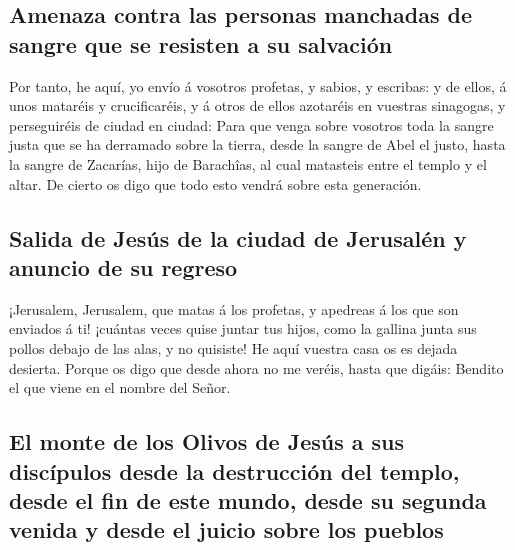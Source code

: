 \hypertarget{amenaza-contra-las-personas-manchadas-de-sangre-que-se-resisten-a-su-salvaciuxf3n}{%
\subsection{Amenaza contra las personas manchadas de sangre que se
resisten a su
salvación}\label{amenaza-contra-las-personas-manchadas-de-sangre-que-se-resisten-a-su-salvaciuxf3n}}

 Por tanto, he aquí, yo envío á vosotros profetas, y
sabios, y escribas: y de ellos, á unos mataréis y crucificaréis, y á
otros de ellos azotaréis en vuestras sinagogas, y perseguiréis de ciudad
en ciudad:  Para que venga sobre vosotros toda la sangre
justa que se ha derramado sobre la tierra, desde la sangre de Abel el
justo, hasta la sangre de Zacarías, hijo de Barachîas, al cual matasteis
entre el templo y el altar.  De cierto os digo que todo
esto vendrá sobre esta generación.

\hypertarget{salida-de-jesuxfas-de-la-ciudad-de-jerusaluxe9n-y-anuncio-de-su-regreso}{%
\subsection{Salida de Jesús de la ciudad de Jerusalén y anuncio de su
regreso}\label{salida-de-jesuxfas-de-la-ciudad-de-jerusaluxe9n-y-anuncio-de-su-regreso}}

 ¡Jerusalem, Jerusalem, que matas á los profetas, y
apedreas á los que son enviados á ti! ¡cuántas veces quise juntar tus
hijos, como la gallina junta sus pollos debajo de las alas, y no
quisiste!  He aquí vuestra casa os es dejada desierta.
 Porque os digo que desde ahora no me veréis, hasta que
digáis: Bendito el que viene en el nombre del Señor.

\hypertarget{el-monte-de-los-olivos-de-jesuxfas-a-sus-discuxedpulos-desde-la-destrucciuxf3n-del-templo-desde-el-fin-de-este-mundo-desde-su-segunda-venida-y-desde-el-juicio-sobre-los-pueblos}{%
\subsection{El monte de los Olivos de Jesús a sus discípulos desde la
destrucción del templo, desde el fin de este mundo, desde su segunda
venida y desde el juicio sobre los
pueblos}\label{el-monte-de-los-olivos-de-jesuxfas-a-sus-discuxedpulos-desde-la-destrucciuxf3n-del-templo-desde-el-fin-de-este-mundo-desde-su-segunda-venida-y-desde-el-juicio-sobre-los-pueblos}}

